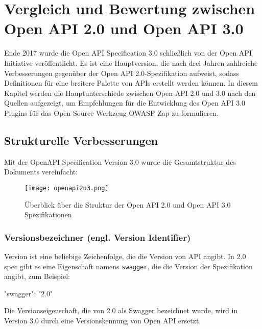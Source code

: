 \chapter{Vergleich und Bewertung zwischen Open API 2.0 und Open API 3.0}
\label{cha:k6}

Ende 2017 wurde die Open API Specification 3.0 schließlich von der Open API Initiative veröffentlicht. Es ist eine Hauptversion, die nach drei Jahren zahlreiche Verbesserungen gegenüber der Open API 2.0-Spezifikation aufweist, sodass Definitionen für eine breitere Palette von APIs erstellt werden können. In diesem Kapitel werden die Hauptunterschiede zwischen Open API 2.0 und 3.0 nach den Quellen\cite{swagger20Github, openapi20Github} aufgezeigt, um Empfehlungen für die Entwicklung des Open API 3.0 Plugins für das Open-Source-Werkzeug OWASP Zap zu formulieren.

\section{Strukturelle Verbesserungen}

Mit der OpenAPI Specification Version 3.0 wurde die Gesamtstruktur des Dokuments vereinfacht:

\newpage

\begin{figure}[h]
	\centering
	\texttt{[image: openapi2u3.png]}
	\caption{Überblick über die Struktur der Open API 2.0 und Open API 3.0 Spezifikationen\cite{openapi2u317}}
	\label{openapi2u317-1}
\end{figure}

\subsection{Versionsbezeichner (engl. Version Identifier)}

Version ist eine beliebige Zeichenfolge, die die Version von API angibt\cite{openapiversion17}. In 2.0 spec gibt es eine Eigenschaft namens \texttt{swagger}, die die Version der Spezifikation angibt, zum Beispiel:\\

\begin{LaTeXCode}[caption={Version von Swagger},captionpos=b, label=LaTeXCode:swagger2.0-1][numbers=none]
"swagger": "2.0"\\
\end{LaTeXCode}

Die Versionseigenschaft, die von 2.0 als Swagger bezeichnet wurde, wird in Version 3.0 durch eine Versionskennung von Open API ersetzt.\\

